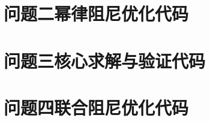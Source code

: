 \documentclass[withoutpreface]{../../../templates/CUMCM2026-Complete-LaTeX/cumcmthesis}
\begin{document}
\begin{appendices}
\section{问题二幂律阻尼优化代码}


\section{问题三核心求解与验证代码}


\section{问题四联合阻尼优化代码}


\end{appendices}
\end{document}

